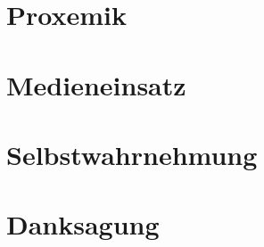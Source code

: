 \documentclass[../main.tex]{subfiles}
\begin{document}
    \section{Proxemik}
    
    \section{Medieneinsatz}
    
    \section{Selbstwahrnehmung}
    
    \section*{Danksagung}
    
\end{document}
